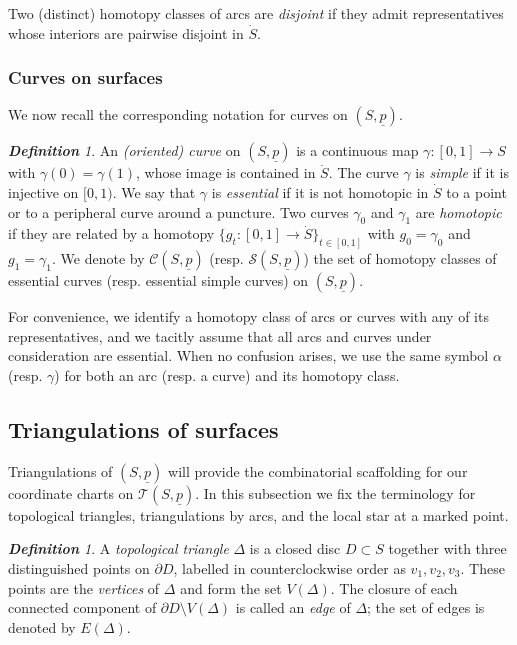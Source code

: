\documentclass[11pt, letterpaper]{amsart}
\theoremstyle{definition}
\theoremstyle{remark}
\newtheorem{definition}[theorem]{\rm\bf Definition}
\newcommand{\up}{\underline{p}}
\newcommand{\Sp}{(S,\up)}
\newcommand{\cC}{\mathcal{C}}
\newcommand{\cTp}{\mathcal{T} (S,\up)}
\newcommand{\cS}{\mathcal{S}}
\newcommand{\DEF}{} \newcommand{\WARN}{\textcolor{red}} \newcommand{\ALT}{\textcolor{brown}} \newcommand{\TODO}{\textcolor{teal}} %
\numberwithin{equation}{section}
\begin{document}
Two (distinct) homotopy classes of arcs are \DEF{\em disjoint} if they admit representatives whose interiors are pairwise disjoint in \(\dot{S}\). 



\subsubsection{Curves on surfaces}
We now recall the corresponding notation for curves on \(\Sp\).



\begin{definition}
An \DEF{\em (oriented) curve} on \(\Sp\) is a continuous map \(\gamma \colon [0,1] \to S\) with \(\gamma(0) = \gamma(1)\), whose image is contained in $\dot{S}$. 
The curve \(\gamma\) is \DEF{\em simple} if it is injective on \([0,1)\).
We say that \(\gamma\) is \DEF{\em essential} if it is not homotopic in \(\dot{S}\) to a point or to a peripheral curve around a puncture.
Two curves \(\gamma_0\) and \(\gamma_1\) are \DEF{\em homotopic} if they are related by a homotopy \(\{ g_t \colon [0,1] \to \dot{S} \}_{t \in [0,1]}\) with \(g_0 = \gamma_0\) and \(g_1 = \gamma_1\).
We denote by \(\cC\Sp\) (resp. \(\cS\Sp\)) the set of homotopy classes of essential curves (resp. essential simple curves) on \(\Sp\).
\end{definition}





For convenience, we identify a homotopy class of arcs or curves with any of its representatives, and we tacitly assume that all arcs and curves under consideration are essential.
When no confusion arises, we use the same symbol \(\alpha\) (resp. \(\gamma\)) for both an arc (resp. a curve) and its homotopy class. 
\subsection{Triangulations of surfaces}
    \label{subsec:triangulation}
Triangulations of \(\Sp\) will provide the combinatorial scaffolding for our coordinate charts on \(\cTp\). 
In this subsection we fix the terminology for topological triangles, triangulations by arcs, and the local star at a marked point.

\begin{definition}
\label{def:top.triang.}
A \DEF{\em topological triangle} \(\Delta\) is a closed disc \(D \subset S\) together with three distinguished points on \(\partial D\), labelled in counterclockwise order as \(v_1, v_2, v_3\).
These points are the \DEF{\em vertices} of \(\Delta\) and form the set \(V(\Delta)\).
The closure of each connected component of \(\partial D \setminus V(\Delta)\) is called an \DEF{\em edge} of \(\Delta\); the set of edges is denoted by \(E(\Delta)\).
\end{definition}
\end{document}
